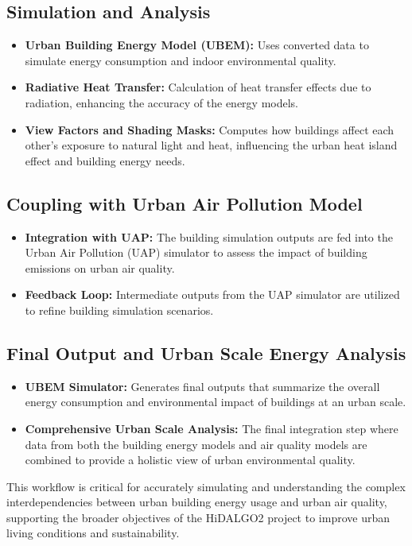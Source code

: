 \documentclass[runningheads]{llncs}
\begin{document}
\subsection{Simulation and Analysis}
\begin{itemize}
    \item \textbf{Urban Building Energy Model (UBEM):} Uses converted data to simulate energy consumption and indoor environmental quality.
    \item \textbf{Radiative Heat Transfer:} Calculation of heat transfer effects due to radiation, enhancing the accuracy of the energy models.
    \item \textbf{View Factors and Shading Masks:} Computes how buildings affect each other's exposure to natural light and heat, influencing the urban heat island effect and building energy needs.
\end{itemize}

\subsection{Coupling with Urban Air Pollution Model}
\begin{itemize}
    \item \textbf{Integration with UAP:} The building simulation outputs are fed into the Urban Air Pollution (UAP) simulator to assess the impact of building emissions on urban air quality.
    \item \textbf{Feedback Loop:} Intermediate outputs from the UAP simulator are utilized to refine building simulation scenarios.
\end{itemize}

\subsection{Final Output and Urban Scale Energy Analysis}
\begin{itemize}
    \item \textbf{UBEM Simulator:} Generates final outputs that summarize the overall energy consumption and environmental impact of buildings at an urban scale.
    \item \textbf{Comprehensive Urban Scale Analysis:} The final integration step where data from both the building energy models and air quality models are combined to provide a holistic view of urban environmental quality.
\end{itemize}

This workflow is critical for accurately simulating and understanding the complex interdependencies between urban building energy usage and urban air quality, supporting the broader objectives of the HiDALGO2 project to improve urban living conditions and sustainability.
\end{document}
